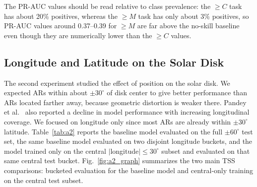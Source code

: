 The PR-AUC values should be read relative to class prevalence: the $\geq C$ task has about 20\% positives, whereas the $\geq M$ task has only about 3\% positives, so PR-AUC values around 0.37--0.39 for $\geq M$ are far above the no-skill baseline even though they are numerically lower than the $\geq C$ values.

\subsection{Longitude and Latitude on the Solar Disk}

The second experiment studied the effect of position on the solar disk. We expected ARs within about $\pm 30^\circ$ of disk center to give better performance than ARs located farther away, because geometric distortion is weaker there. Pandey et al.~\cite{ref_long} also reported a decline in model performance with increasing longitudinal coverage. We focused on longitude only since most ARs are already within $\pm30^\circ$ latitude. Table~\ref{tab:a2} reports the baseline model evaluated on the full $\pm60^\circ$ test set, the same baseline model evaluated on two disjoint longitude buckets, and the model trained only on the central $|$longitude$| \leq 30^\circ$ subset and evaluated on that same central test bucket. Fig.~\ref{fig:a2_graph} summarizes the two main TSS comparisons: bucketed evaluation for the baseline model and central-only training on the central test subset.

